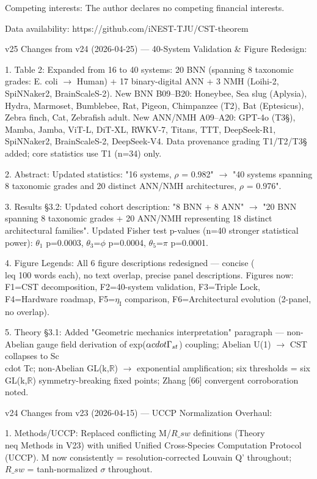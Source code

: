 \documentclass[a4paper,12pt]{article}
\begin{document}
Competing interests: The author declares no competing financial interests.

Data availability: https://github.com/iNEST-TJU/CST-theorem

v25 Changes from v24 (2026-04-25) --- 40-System Validation \& Figure Redesign:

1. Table 2: Expanded from 16 to 40 systems: 20 BNN (spanning 8 taxonomic grades: E. coli $\rightarrow$ Human) + 17 binary-digital ANN + 3 NMH (Loihi-2, SpiNNaker2, BrainScaleS-2). New BNN B09--B20: Honeybee, Sea slug (Aplysia), Hydra, Marmoset, Bumblebee, Rat, Pigeon, Chimpanzee (T2\dag), Bat (Eptesicus), Zebra finch, Cat, Zebrafish adult. New ANN/NMH A09--A20: GPT-4o (T3\S{}), Mamba, Jamba, ViT-L, DiT-XL, RWKV-7, Titans, TTT, DeepSeek-R1, SpiNNaker2, BrainScaleS-2, DeepSeek-V4. Data provenance grading T1/T2\dag/T3\S{} added; core statistics use T1 (n=34) only.

2. Abstract: Updated statistics: "16 systems, $\rho$ = 0.982" $\rightarrow$ "40 systems spanning 8 taxonomic grades and 20 distinct ANN/NMH architectures, $\rho$ = 0.976".

3. Results \S{}3.2: Updated cohort description: "8 BNN + 8 ANN" $\rightarrow$ "20 BNN spanning 8 taxonomic grades + 20 ANN/NMH representing 18 distinct architectural families". Updated Fisher test p-values (n=40 stronger statistical power): $\theta_1$ p=0.0003, $\theta_3$=$\phi$ p=0.0004, $\theta_5$=$\pi$ p=0.0001.

4. Figure Legends: All 6 figure descriptions redesigned --- concise ( \\leq 100 words each), no text overlap, precise panel descriptions. Figures now: F1=CST decomposition, F2=40-system validation, F3=Triple Lock, F4=Hardware roadmap, F5=$\eta_{\text{I}}$ comparison, F6=Architectural evolution (2-panel, no overlap).

5. Theory \S{}3.1: Added "Geometric mechanics interpretation" paragraph --- non-Abelian gauge field derivation of exp($\alpha \\cdot \Gamma_{st}$) coupling; Abelian U(1) $\rightarrow$ CST collapses to Sc \\cdot Tc; non-Abelian GL(k,$\mathbb{R}$) $\rightarrow$ exponential amplification; six thresholds = six GL(k,$\mathbb{R}$) symmetry-breaking fixed points; Zhang [66] convergent corroboration noted.

v24 Changes from v23 (2026-04-15) --- UCCP Normalization Overhaul:

1. Methods/UCCP: Replaced conflicting M/$R\_{sw}$ definitions (Theory  \\neq  Methods in V23) with unified Unified Cross-Species Computation Protocol (UCCP). M now consistently = resolution-corrected Louvain Q' throughout; $R\_{sw}$ = tanh-normalized $\sigma$ throughout.
\end{document}
